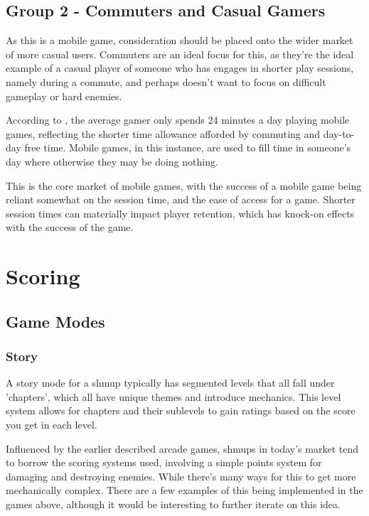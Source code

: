 \documentclass{scrartcl}
\let\cite\textcite
\begin{document}
\subsection{Group 2 - Commuters and Casual Gamers}

As this is a mobile game, consideration should be placed onto the wider market of more casual users. Commuters are an ideal focus for this, as they're the ideal example of a casual player of someone who has engages in shorter play sessions, namely during a commute, and perhaps doesn't want to focus on difficult gameplay or hard enemies.

According to \cite{Verto001}, the average gamer only spends 24 minutes a day playing mobile games, reflecting the shorter time allowance afforded by commuting and day-to-day free time. Mobile games, in this instance, are used to fill time in someone's day where otherwise they may be doing nothing.

This is the core market of mobile games, with the success of a mobile game being reliant somewhat on the session time, and the ease of access for a game. Shorter session times can materially impact player retention, which has knock-on effects with the success of the game.

\section{Scoring}

\subsection{Game Modes}

\subsubsection{Story}

A story mode for a shmup typically has segmented levels that all fall under 'chapters', which all have unique themes and introduce mechanics. This level system allows for chapters and their sublevels to gain ratings based on the score you get in each level.

Influenced by the earlier described arcade games, shmups in today's market tend to borrow the scoring systems used, involving a simple points system for damaging and destroying enemies. While there's many ways for this to get more mechanically complex. There are a few examples of this being implemented in the games above, although it would be interesting to further iterate on this idea.
\end{document}
